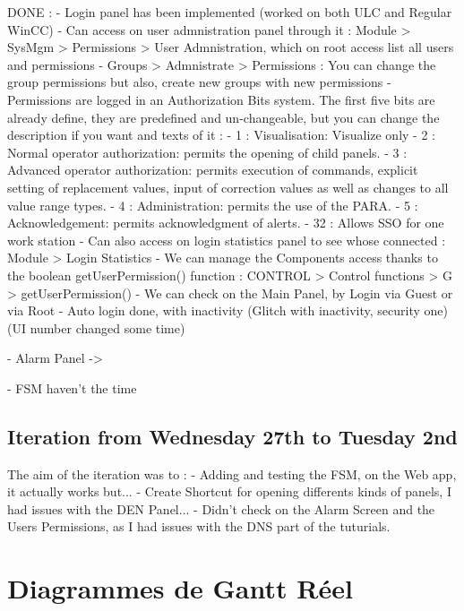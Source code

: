 \documentclass[a4paper, 10pt]{article}
\begin{document}
DONE :  - Login panel has been implemented (worked on both ULC and Regular WinCC)
        - Can access on user admnistration panel through it : Module > SysMgm > Permissions > User Admnistration, which on root access list all users and permissions
        - Groups > Admnistrate > Permissions : You can change the group permissions but also, create new groups with new permissions
        - Permissions are logged in an Authorization Bits system. The first five bits are already define, they are predefined and un-changeable, but you can change the description if you want and texts of it : 
            - 1 : Visualisation: Visualize only
            - 2 : Normal operator authorization: permits the opening of child panels.
            - 3 : Advanced operator authorization: permits execution of commands, explicit setting of replacement values, input of correction values as well as changes to all value range types.
            - 4 : Administration: permits the use of the PARA.
            - 5 : Acknowledgement: permits acknowledgment of alerts.
            - 32 : Allows SSO for one work station
        - Can also access on login statistics panel to see whose connected : Module > Login Statistics
        - We can manage the Components access thanks to the boolean getUserPermission() function : CONTROL > Control functions > G > getUserPermission()
        - We can check on the Main Panel, by Login via Guest or via Root
        - Auto login done, with inactivity (Glitch with inactivity, security one) (UI number changed some time)

        - Alarm Panel -> 

        - FSM haven't the time

\subsection{Iteration from Wednesday 27th to Tuesday 2nd}
The aim of the iteration was to :
    - Adding and testing the FSM, on the Web app, it actually works but...
    - Create Shortcut for opening differents kinds of panels, I had issues with the DEN Panel...
    - Didn't check on the Alarm Screen and the Users Permissions, as I had issues with the DNS part of the tuturials.
\section{Diagrammes de Gantt Réel}
\end{document}
